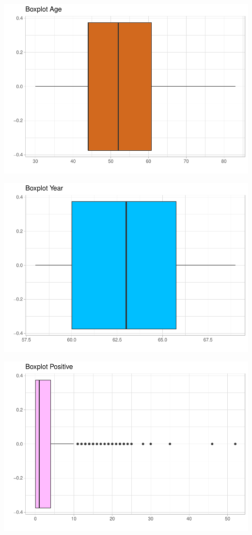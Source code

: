 \documentclass[
]{article}
\begin{document}
\begin{center}\includegraphics{EDA2_files/figure-latex/unnamed-chunk-11-1} \end{center}

\begin{center}\includegraphics{EDA2_files/figure-latex/unnamed-chunk-11-2} \end{center}

\begin{center}\includegraphics{EDA2_files/figure-latex/unnamed-chunk-11-3} \end{center}
\end{document}
